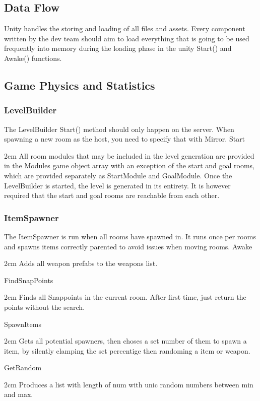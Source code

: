 \documentclass[11pt]{article}
\newenvironment{indentall}{\begin{adjustwidth}{2cm}{}}{\end{adjustwidth}}
\begin{document}
\subsection{Data Flow}
Unity handles the storing and loading of all files and assets. Every component written by the dev team should aim to load everything that is going to be used frequently into memory during the loading phase in the unity Start() and Awake() functions.

\subsection{Game Physics and Statistics}
\subsubsection{LevelBuilder}
The LevelBuilder Start() method should only happen on the server. When spawning a new room as the host, you need to specify that with Mirror.
\newline 
\newline Start
\begin{indentall}
All room modules that may be included in the level generation are provided in the Modules game object array with an exception of the start and goal rooms, which are provided separately as StartModule and GoalModule. Once the LevelBuilder is started, the level is generated in its entirety. It is however required that the start and goal rooms are reachable from each other.
\end{indentall}

\subsubsection{ItemSpawner}
The ItemSpawner is run when all rooms have spawned in. It runs once per rooms and spawns items correctly parented to avoid issues when moving rooms.
\newline 
\newline Awake
\begin{indentall}
Adds all weapon prefabs to the weapons list.
\end{indentall}
FindSnapPoints
\begin{indentall}
Finds all Snappoints in the current room. After first time, just return the points without the search.
\end{indentall}
SpawnItems
\begin{indentall}
Gets all potential spawners, then choses a set number of them to spawn a item, by silently clamping the set percentige then randoming a item or weapon.
\end{indentall}
GetRandom
\begin{indentall}
Produces a list with length of num with unic random numbers between min and max.
\end{indentall}
\end{document}
